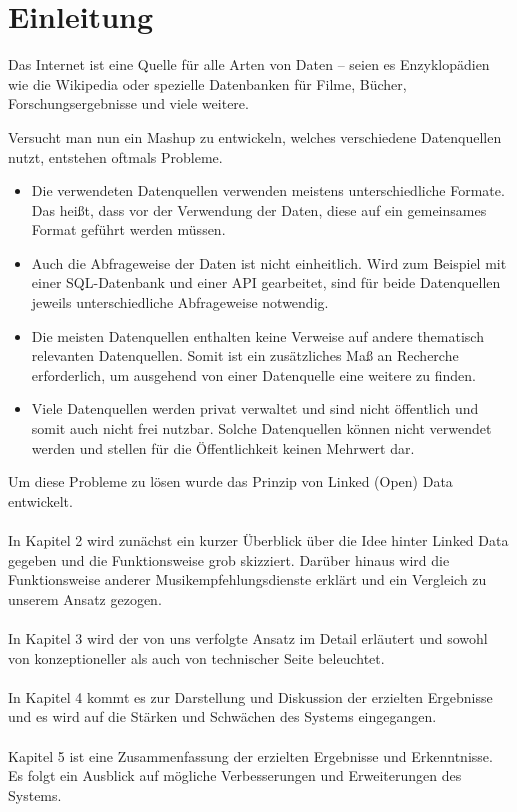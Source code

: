 \section{Einleitung}

Das Internet ist eine Quelle für alle Arten von Daten -- seien es Enzyklopädien wie die Wikipedia oder spezielle Datenbanken für Filme, Bücher, Forschungsergebnisse und viele weitere.


Versucht man nun ein Mashup zu entwickeln, welches verschiedene Datenquellen nutzt, entstehen oftmals Probleme.

\begin{itemize}
\item Die verwendeten Datenquellen verwenden meistens unterschiedliche Formate. Das heißt, dass vor der Verwendung der Daten, diese auf ein gemeinsames Format geführt werden müssen.
\item Auch die Abfrageweise der Daten ist nicht einheitlich. Wird zum Beispiel mit einer SQL-Datenbank und einer API gearbeitet, sind für beide Datenquellen jeweils unterschiedliche Abfrageweise notwendig.
\item Die meisten Datenquellen enthalten keine Verweise auf andere thematisch relevanten Datenquellen. Somit ist ein zusätzliches Maß an Recherche erforderlich, um ausgehend von einer Datenquelle eine weitere zu finden.
\item Viele Datenquellen werden privat verwaltet und sind nicht öffentlich und somit auch nicht frei nutzbar. Solche Datenquellen können nicht verwendet werden und stellen für die Öffentlichkeit keinen Mehrwert dar.
\end{itemize}

Um diese Probleme zu lösen wurde das Prinzip von Linked (Open) Data entwickelt.

\paragraph{} In Kapitel 2 wird zunächst ein kurzer Überblick über die Idee hinter Linked Data gegeben und die Funktionsweise grob skizziert. Darüber hinaus wird die Funktionsweise anderer Musikempfehlungsdienste erklärt und ein Vergleich zu unserem Ansatz gezogen.

\paragraph{} In Kapitel 3 wird der von uns verfolgte Ansatz im Detail erläutert und sowohl von konzeptioneller als auch von technischer Seite beleuchtet.

\paragraph{} In Kapitel 4 kommt es zur Darstellung und Diskussion der erzielten Ergebnisse und es wird auf die Stärken und Schwächen des Systems eingegangen.

\paragraph{} Kapitel 5 ist eine Zusammenfassung der erzielten Ergebnisse und Erkenntnisse. Es folgt ein Ausblick auf mögliche Verbesserungen und Erweiterungen des Systems.